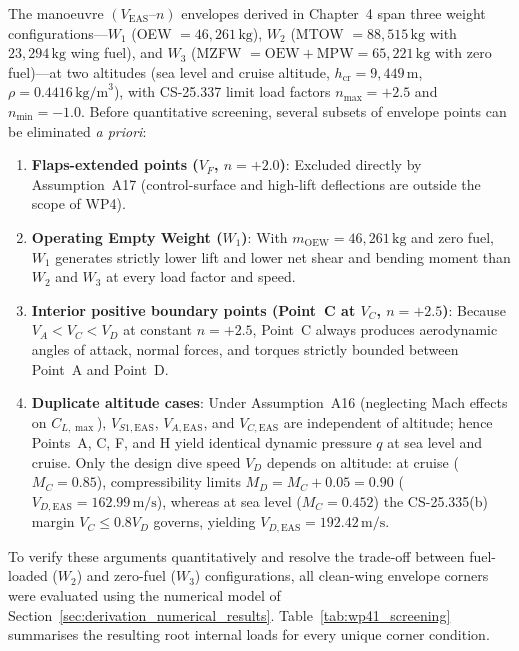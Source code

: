 The manoeuvre $(V_{\mathrm{EAS}}\text{--}n)$ envelopes derived in Chapter~4 span three weight configurations---$W_1$ (OEW $= 46{,}261\,\text{kg}$), $W_2$ (MTOW $= 88{,}515\,\text{kg}$ with $23{,}294\,\text{kg}$ wing fuel), and $W_3$ (MZFW $= \mathrm{OEW} + \mathrm{MPW} = 65{,}221\,\text{kg}$ with zero fuel)---at two altitudes (sea level and cruise altitude, $h_{\mathrm{cr}} = 9{,}449\,\text{m}$, $\rho = 0.4416\,\text{kg/m}^3$), with CS-25.337 limit load factors $n_{\max} = +2.5$ and $n_{\min} = -1.0$. Before quantitative screening, several subsets of envelope points can be eliminated \textit{a priori}:
\begin{enumerate}
    \item \textbf{Flaps-extended points ($V_F$, $n = +2.0$)}: Excluded directly by Assumption~A17 (control-surface and high-lift deflections are outside the scope of WP4).
    \item \textbf{Operating Empty Weight ($W_1$)}: With $m_{\mathrm{OEW}} = 46{,}261\,\text{kg}$ and zero fuel, $W_1$ generates strictly lower lift and lower net shear and bending moment than $W_2$ and $W_3$ at every load factor and speed.
    \item \textbf{Interior positive boundary points (Point~C at $V_C$, $n = +2.5$)}: Because $V_A < V_C < V_D$ at constant $n = +2.5$, Point~C always produces aerodynamic angles of attack, normal forces, and torques strictly bounded between Point~A and Point~D.
    \item \textbf{Duplicate altitude cases}: Under Assumption~A16 (neglecting Mach effects on $C_{L,\max}$), $V_{S1,\mathrm{EAS}}$, $V_{A,\mathrm{EAS}}$, and $V_{C,\mathrm{EAS}}$ are independent of altitude; hence Points~A, C, F, and H yield identical dynamic pressure $q$ at sea level and cruise. Only the design dive speed $V_D$ depends on altitude: at cruise ($M_C = 0.85$), compressibility limits $M_D = M_C + 0.05 = 0.90$ ($V_{D,\mathrm{EAS}} = 162.99\,\text{m/s}$), whereas at sea level ($M_C = 0.452$) the CS-25.335(b) margin $V_C \le 0.8 V_D$ governs, yielding $V_{D,\mathrm{EAS}} = 192.42\,\text{m/s}$.
\end{enumerate}

To verify these arguments quantitatively and resolve the trade-off between fuel-loaded ($W_2$) and zero-fuel ($W_3$) configurations, all clean-wing envelope corners were evaluated using the numerical model of Section~\ref{sec:derivation_numerical_results}. Table~\ref{tab:wp41_screening} summarises the resulting root internal loads for every unique corner condition.

